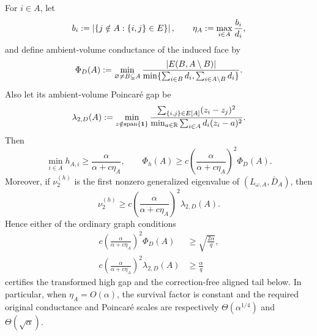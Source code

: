 \begin{corollary}
\label{cor:aesp-cd-proper-face-leakage-conductance}
For \(i\in A\), let
\begin{equation*}
 b_i:=\left\lvert \{j\notin A:\{i,j\}\in E\} \right\rvert,
 \qquad
 \eta_A:=\max_{i\in A}\frac{b_i}{d_i},
\end{equation*}
and define ambient-volume conductance of the induced face by
\begin{equation*}
 \Phi_D(A)
 :=\min_{\varnothing\neq B\subsetneq A}
 \frac{\left\lvert E(B,A\setminus B) \right\rvert}
 {\min\{\sum_{i\in B}d_i,\sum_{i\in A\setminus B}d_i\}}.
\end{equation*}
Also let its ambient-volume Poincar\'e gap be
\begin{equation*}
 \lambda_{2,D}(A)
 :=\min_{z\notin\operatorname{span}\{\mathbf{1}\}}
 \frac{\sum_{\{i,j\}\in E[A]}(z_i-z_j)^2}
 {\min_{a\in\mathbb R}\sum_{i\in A}d_i(z_i-a)^2}.
\end{equation*}
Then
\begin{equation}
 \min_{i\in A}h_{A,i}
 \geq\frac{\alpha}{\alpha+c\eta_A},
 \qquad
 \Phi_h(A)
 \geq
 c\left(\frac{\alpha}{\alpha+c\eta_A}\right)^2\Phi_D(A).
 \label{eq:aesp-cd-proper-face-leakage-conductance}
\end{equation}
Moreover, if \(\nu_2^{(h)}\) is the first nonzero generalized eigenvalue of
\((L_{\omega,A},\bar D_A)\), then
\begin{equation}
 \nu_2^{(h)}
 \geq c\left(\frac{\alpha}{\alpha+c\eta_A}\right)^2
          \lambda_{2,D}(A).
 \label{eq:aesp-cd-proper-face-leakage-poincare}
\end{equation}
Hence either of the ordinary graph conditions
\begin{align}
 c\left(\frac{\alpha}{\alpha+c\eta_A}\right)^2\Phi_D(A)
 &\geq\sqrt{\frac{2\alpha}{q}},
 \label{eq:aesp-cd-proper-face-original-conductance-certificate}\\
 c\left(\frac{\alpha}{\alpha+c\eta_A}\right)^2\lambda_{2,D}(A)
 &\geq\frac{\alpha}{q}
 \label{eq:aesp-cd-proper-face-original-poincare-certificate}
\end{align}
certifies the transformed high gap and the correction-free aligned tail
below.
In particular, when \(\eta_A=O(\alpha)\), the survival factor is constant
and the required original conductance and Poincar\'e scales are respectively
\(\Theta(\alpha^{1/4})\) and \(\Theta(\sqrt\alpha)\).
\end{corollary}

